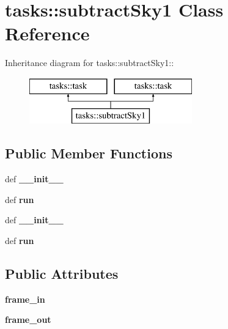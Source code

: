\section{tasks::subtract\-Sky1 Class Reference}
\label{classtasks_1_1subtractSky1}
Inheritance diagram for tasks::subtract\-Sky1::\begin{figure}[H]
\begin{center}
\leavevmode
\includegraphics[height=2cm]{classtasks_1_1subtractSky1}
\end{center}
\end{figure}
\subsection*{Public Member Functions}
\begin{CompactItemize}
\item 
def \textbf{\_\-\_\-init\_\-\_\-}\label{classtasks_1_1subtractSky1_2663bd76386828b4ca385f7d06c166f6}

\item 
def \textbf{run}\label{classtasks_1_1subtractSky1_2901d41af6f14b89836239489009c1c1}

\item 
def \textbf{\_\-\_\-init\_\-\_\-}\label{classtasks_1_1subtractSky1_2663bd76386828b4ca385f7d06c166f6}

\item 
def \textbf{run}\label{classtasks_1_1subtractSky1_2901d41af6f14b89836239489009c1c1}

\end{CompactItemize}
\subsection*{Public Attributes}
\begin{CompactItemize}
\item 
\textbf{frame\_\-in}\label{classtasks_1_1subtractSky1_ac699ac6bd87b3f9dfe778ad289a7d6a}

\item 
\textbf{frame\_\-out}\label{classtasks_1_1subtractSky1_a099631b4e91b2e7143b71c3adbb2840}

\end{CompactItemize}
